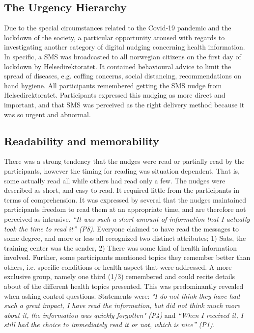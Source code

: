 \subsection{The Urgency Hierarchy}
Due to the special circumstances related to the Covid-19 pandemic and the lockdown of the society, a particular opportunity aroused with regards to investigating another category of digital nudging concerning health information. In specific, a SMS was broadcasted to all norwegian citizens on the first day of lockdown by Helsedirektoratet. It contained behavioural advice to limit the spread of diseases, e.g. coffing concerns, social distancing, recommendations on hand hygiene. All participants remembered getting the SMS nudge from Helsedirektoratet. Participants expressed this nudging as more direct and important, and that SMS was perceived as the right delivery method because it was so urgent and abnormal. 

\subsection{Readability and memorability}
There was a strong tendency that the nudges were read or partially read by the participants, however the timing for reading was situation dependent. That is, some actually read all while others had read only a few. The nudges were described as short, and easy to read. It required little from the participants in terms of comprehension. It was expressed by several that the nudges maintained participants freedom to read them at an appropriate time, and are therefore not perceived as intrusive. \textit{“It was such a short amount of information that I actually took the time to read it” (P8)}. Everyone claimed to have read the messages to some degree, and more or less all recognized two distinct attributes; 1) Sats, the training center was the sender, 2) There was some kind of health information involved. Further, some participants mentioned topics they remember better than others, i.e. specific conditions or health aspect that were addressed. A more exclusive group, namely one third (1/3) remembered and could recite details about of the different health topics presented. This was predominantly revealed when asking control questions. Statements were:  \textit{"I do not think they have had such a great impact, I have read the information, but did not think much more about it, the information was quickly forgotten" (P4)} and \textit{“When I received it, I still had the choice to immediately read it or not, which is nice” (P1). }

